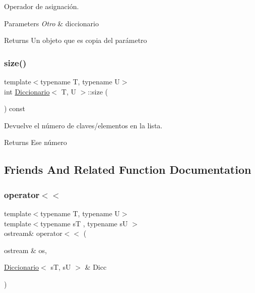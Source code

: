 Operador de asignación. 


\begin{DoxyParams}{Parameters}
{\em Otro} & diccionario \\
\hline
\end{DoxyParams}
\begin{DoxyReturn}{Returns}
Un objeto que es copia del parámetro 
\end{DoxyReturn}
\mbox{\label{classDiccionario_aa576b001759429fd58210ca57257d6f8}} 
\subsubsection{\texorpdfstring{size()}{size()}}
{\footnotesize\ttfamily template$<$typename T, typename U$>$ \\
int \hyperlink{classDiccionario}{Diccionario}$<$ T, U $>$\+::size (\begin{DoxyParamCaption}{ }\end{DoxyParamCaption}) const\hspace{0.3cm}{\ttfamily [inline]}}



Devuelve el número de claves/elementos en la lista. 

\begin{DoxyReturn}{Returns}
Ese número 
\end{DoxyReturn}


\subsection{Friends And Related Function Documentation}
\mbox{\label{classDiccionario_a081f33124f659cc1fcd76601c3ffea6c}} 
\subsubsection{\texorpdfstring{operator$<$$<$}{operator<<}}
{\footnotesize\ttfamily template$<$typename T, typename U$>$ \\
template$<$typename sT , typename sU $>$ \\
ostream\& operator$<$$<$ (\begin{DoxyParamCaption}\item[{ostream \&}]{os,  }\item[{\hyperlink{classDiccionario}{Diccionario}$<$ sT, sU $>$ \&}]{Dicc }\end{DoxyParamCaption})\hspace{0.3cm}{\ttfamily [friend]}}



